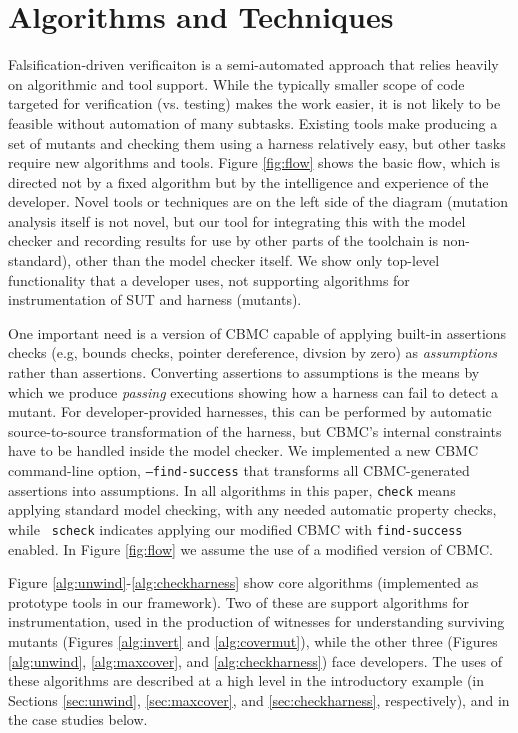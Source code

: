 \documentclass[conference]{IEEEtran}
\begin{document}
\section{Algorithms and Techniques}

Falsification-driven verificaiton is a semi-automated approach that
relies heavily on algorithmic and tool support.  While the typically
smaller scope of code targeted for verification (vs. testing) makes the work easier,
it is not likely to be feasible without automation of many
subtasks. Existing tools make producing a set of mutants and checking
them using a harness relatively easy, but other tasks require new algorithms
and tools.  Figure \ref{fig:flow} shows the basic flow, which is directed
not by a fixed algorithm but by the intelligence and experience
\cite{NeroWolfe} of the
developer.  Novel tools or techniques are on the left side of the
diagram (mutation analysis itself is not novel, but our tool for integrating
this with the model checker and recording results for use by other
parts of the toolchain is non-standard), other than the model checker
itself. We show only top-level functionality that a developer uses,
not supporting algorithms for instrumentation of SUT and harness (mutants).

One important need is a version of CBMC capable of applying built-in
assertions checks (e.g, bounds checks, pointer dereference, divsion by
zero) as \emph{assumptions} rather than assertions.  Converting
assertions to assumptions is the means by which we produce
\emph{passing} executions showing how a harness can fail to detect a
mutant.  For developer-provided harnesses, this can be performed by
automatic source-to-source transformation of the harness, but CBMC's
internal constraints have to be handled inside the model checker.  We
implemented a new CBMC command-line option, {\tt --find-success} that
transforms all CBMC-generated assertions into assumptions.  In all
algorithms in this paper, {\tt check} means applying standard model
checking, with any needed automatic property checks, while {\tt
  scheck} indicates applying our modified CBMC with {\tt find-success}
enabled.  In Figure \ref{fig:flow} we assume the use of a modified
version of CBMC.

Figure \ref{alg:unwind}-\ref{alg:checkharness} show core algorithms
(implemented as prototype tools in our framework).  Two of these are
support algorithms for instrumentation, used in the production of witnesses for
understanding surviving mutants (Figures \ref{alg:invert} and
\ref{alg:covermut}), while the other three (Figures \ref{alg:unwind},
\ref{alg:maxcover}, and \ref{alg:checkharness}) face developers.  The uses
of these algorithms are described at a high level in the introductory
example (in Sections \ref{sec:unwind}, \ref{sec:maxcover}, and
\ref{sec:checkharness}, respectively), and in the case studies below.
\end{document}
